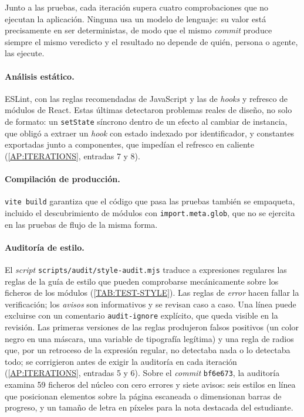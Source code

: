 Junto a las pruebas, cada iteración supera cuatro comprobaciones que no ejecutan la
aplicación. Ninguna usa un modelo de lenguaje: su valor está precisamente en ser
deterministas, de modo que el mismo \textit{commit} produce siempre el mismo veredicto y
el resultado no depende de quién, persona o agente, las ejecute.

\paragraph{Análisis estático.} ESLint, con las reglas recomendadas de JavaScript y las de
\textit{hooks} y refresco de módulos de React. Estas últimas detectaron problemas reales de
diseño, no solo de formato: un \texttt{setState} síncrono dentro de un efecto al cambiar de
instancia, que obligó a extraer un \textit{hook} con estado indexado por identificador, y
constantes exportadas junto a componentes, que impedían el refresco en caliente
(\cref{AP:ITERATIONS}, entradas 7 y 8).

\paragraph{Compilación de producción.} \texttt{vite build} garantiza que el código que pasa
las pruebas también se empaqueta, incluido el descubrimiento de módulos con
\texttt{import.meta.glob}, que no se ejercita en las pruebas de flujo de la misma forma.

\paragraph{Auditoría de estilo.} El \textit{script} \texttt{scripts/audit/style-audit.mjs}
traduce a expresiones regulares las reglas de la guía de estilo que pueden comprobarse
mecánicamente sobre los ficheros de los módulos (\cref{TAB:TEST-STYLE}). Las reglas de
\emph{error} hacen fallar la verificación; los \emph{avisos} son informativos y se revisan
caso a caso. Una línea puede excluirse con un comentario \texttt{audit-ignore} explícito,
que queda visible en la revisión. Las primeras versiones de las reglas produjeron falsos
positivos (un color negro en una máscara, una variable de tipografía legítima) y una regla
de radios que, por un retroceso de la expresión regular, no detectaba nada o lo detectaba
todo; se corrigieron antes de exigir la auditoría en cada iteración (\cref{AP:ITERATIONS},
entradas 5 y 6). Sobre el \textit{commit} \texttt{bf6e673}, la auditoría examina 59 ficheros
del núcleo con cero errores y siete avisos: seis estilos en línea que posicionan
elementos sobre la página escaneada o dimensionan barras de progreso, y un tamaño de letra en
píxeles para la nota destacada del estudiante.

